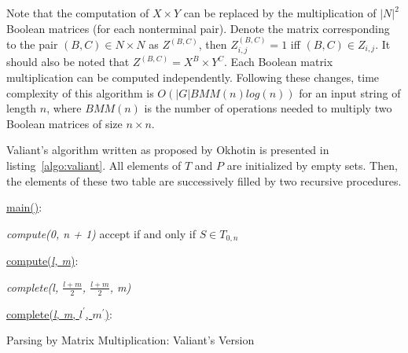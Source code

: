 Note that the computation of $X \times Y$  can be replaced by the multiplication of $|N|^2$ Boolean matrices (for each nonterminal pair).
Denote the matrix corresponding to the pair $(B, C) \in N \times N$ as $Z^{(B, C)}$, then $Z_{i, j}^{(B, C)} = 1$ iff $(B, C) \in Z_{i, j}$.
It should also be noted that $Z^{(B, C)} = X^{B} \times Y^{C}$.
Each Boolean matrix multiplication can be computed independently.
Following these changes, time complexity of this algorithm is $O(|G|BMM(n)log(n))$ for an input string of length $n$, where $BMM(n)$ is the number of operations needed to multiply two Boolean matrices of size $n \times n$.

Valiant's algorithm written as proposed by Okhotin is presented in listing~\ref{algo:valiant}.
All elements of $T$ and $P$ are initialized by empty sets.
Then, the elements of these two table are successively filled by two recursive procedures.

\begin{algorithm}[h]
\SetAlgoNoLine
{}
\underline{main()}{:}{

 \textit{compute(0, n + 1)\;}
 accept if and only if $S \in T_{0, n}$
 \linebreak
 }

\underline{compute(\textit{l, m})}{:}{

 \textit{complete(l, $\frac{l+m}{2}$, $\frac{l+m}{2}$, m)}
 \linebreak
 }

\underline{complete(\textit{l, m}, $l^\prime$, $m^\prime$)}{:}{

 }
\caption{Parsing by Matrix Multiplication: Valiant's Version}
\label{algo:valiant}
\end{algorithm}

